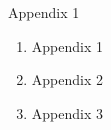 \begin{frame}{Appendix 1}
	\begin{enumerate}
		\setlength\itemsep{\slideitemgap}
		\item Appendix 1
		\item Appendix 2
		\item Appendix 3
	\end{enumerate}				
\end{frame}